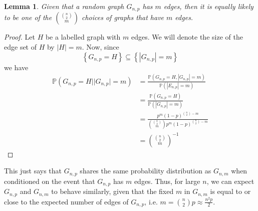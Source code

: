 \documentclass[12pt,oneside,reqno]{amsart}
\newtheorem{lemma}[theorem]{Lemma}
\theoremstyle{definition}
\numberwithin{equation}{theorem}
\begin{document}
\begin{lemma}\label{equiv}
Given that a random graph $G_{n,p}$ has $m$ edges, then it is equally likely to be one of the $\binom{\binom{n}{2}}{m}$ choices of graphs that have $m$ edges.
\end{lemma}

\begin{proof}
Let $H$ be a labelled graph with $m$ edges. We will denote the size of the edge set of $H$ by $|H| = m$. Now, since $$\left\{{G}_{n, p}=H\right\} \subseteq\left\{\left|G_{n, p}\right|=m\right\}$$
we have 
\newline
$$
\begin{aligned}\label{eqe}
\mathbb{P}\left({G}_{n, p}=H|| G_{n, p} \mid=m\right) & =\frac{\mathbb{P}\left({G}_{n, p}=H,\left|G_{n, p}\right|=m\right)}{\mathbb{P}\left(\left|E_{n, p}\right|=m\right)} \\
& =\frac{\mathbb{P}\left({G}_{n, p}=H\right)}{\mathbb{P}\left(\left|G_{n, p}\right|=m\right)} \\
& =\frac{p^m(1-p)^{\binom{n}{2}-m}}{\binom{\binom{n}{2}}{m} p^m(1-p)^{\binom{n}{2}-m}} \\
& ={\binom{\binom{n}{2}}{m}}^{-1}
\end{aligned}
$$
\end{proof}


This just says that $G_{n,p}$ shares the same probability distribution as $G_{n,m}$ when conditioned on the event that $G_{n,p}$ has $m$ edges. Thus, for large $n$, we can expect $G_{n,p}$ and $G_{n,m}$ to behave similarly, given that the fixed $m$ in $G_{n,m}$ is equal to or close to the expected number of edges of $G_{n,p}$, i.e. $m = \binom{n}{2}p \approx \frac{n^2 p}{2}$.
\newline
\end{document}
